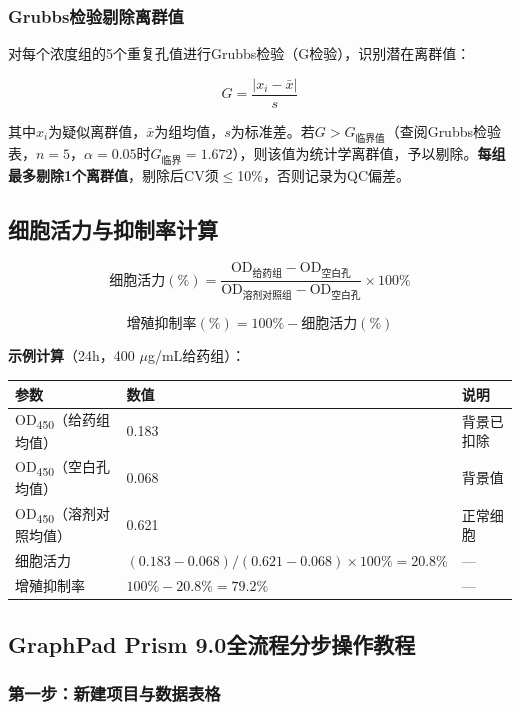 \documentclass[12pt,a4paper]{article}
\newcommand{\um}{\,$\mu$g/mL}
\begin{document}
\subsubsection{Grubbs检验剔除离群值}

对每个浓度组的5个重复孔值进行Grubbs检验（G检验），识别潜在离群值\cite{ref29}：

\[
G = \frac{|x_i - \bar{x}|}{s}
\]

其中$x_i$为疑似离群值，$\bar{x}$为组均值，$s$为标准差。若$G > G_{\text{临界值}}$（查阅Grubbs检验表，$n=5$，$\alpha=0.05$时$G_{\text{临界}}=1.672$），则该值为统计学离群值，予以剔除。\textbf{每组最多剔除1个离群值}，剔除后CV须$\leq$10\%，否则记录为QC偏差。

\subsection{细胞活力与抑制率计算}

\[
\text{细胞活力}(\%) = \frac{\text{OD}_{\text{给药组}} - \text{OD}_{\text{空白孔}}}{\text{OD}_{\text{溶剂对照组}} - \text{OD}_{\text{空白孔}}} \times 100\%
\]

\[
\text{增殖抑制率}(\%) = 100\% - \text{细胞活力}(\%)
\]

\textbf{示例计算}（24h，400\,\um{}给药组）：

\begin{center}
\begin{tabular}{lll}
\toprule
\textbf{参数} & \textbf{数值} & \textbf{说明} \\
\midrule
OD\textsubscript{450}（给药组均值）& 0.183 & 背景已扣除 \\
OD\textsubscript{450}（空白孔均值）& 0.068 & 背景值 \\
OD\textsubscript{450}（溶剂对照均值）& 0.621 & 正常细胞 \\
\midrule
细胞活力 & $(0.183-0.068)/(0.621-0.068)\times100\% = 20.8\%$ & — \\
增殖抑制率 & $100\%-20.8\% = 79.2\%$ & — \\
\bottomrule
\end{tabular}
\end{center}

\subsection{GraphPad Prism 9.0全流程分步操作教程}

\subsubsection{第一步：新建项目与数据表格}
\end{document}
